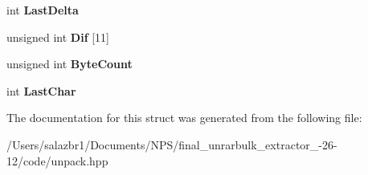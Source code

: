 \begin{DoxyCompactItemize}
\item 
\hypertarget{struct_audio_variables_adb319d2275d33de3f8116a5c078288b1}{int {\bfseries Last\-Delta}}\label{struct_audio_variables_adb319d2275d33de3f8116a5c078288b1}

\item 
\hypertarget{struct_audio_variables_aaca37e0796ab40ea58cfd6017368633b}{unsigned int {\bfseries Dif} \mbox{[}11\mbox{]}}\label{struct_audio_variables_aaca37e0796ab40ea58cfd6017368633b}

\item 
\hypertarget{struct_audio_variables_adf2f28e8a4c3c9ed195182364c85438f}{unsigned int {\bfseries Byte\-Count}}\label{struct_audio_variables_adf2f28e8a4c3c9ed195182364c85438f}

\item 
\hypertarget{struct_audio_variables_af33b9ced85af0976a5d66567488852c4}{int {\bfseries Last\-Char}}\label{struct_audio_variables_af33b9ced85af0976a5d66567488852c4}

\end{DoxyCompactItemize}


The documentation for this struct was generated from the following file\-:\begin{DoxyCompactItemize}
\item 
/\-Users/salazbr1/\-Documents/\-N\-P\-S/final\-\_\-unrarbulk\-\_\-extractor\-\_-\/26-\/12/code/unpack.\-hpp\end{DoxyCompactItemize}
